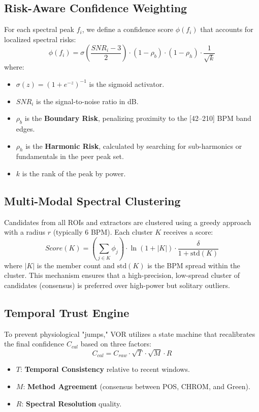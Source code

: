 \documentclass[10pt,journal,compsoc]{IEEEtran}
\begin{document}
\subsection{Risk-Aware Confidence Weighting}
For each spectral peak $f_i$, we define a confidence score $\phi(f_i)$ that accounts for localized spectral risks:
\begin{equation}
\phi(f_i) = \sigma\left(\frac{SNR_i - 3}{2}\right) \cdot (1 - \rho_b) \cdot (1 - \rho_h) \cdot \frac{1}{\sqrt{k}}
\end{equation}
where:
\begin{itemize}
    \item $\sigma(z) = (1+e^{-z})^{-1}$ is the sigmoid activator.
    \item $SNR_i$ is the signal-to-noise ratio in dB.
    \item $\rho_b$ is the \textbf{Boundary Risk}, penalizing proximity to the [42--210] BPM band edges.
    \item $\rho_h$ is the \textbf{Harmonic Risk}, calculated by searching for sub-harmonics or fundamentals in the peer peak set.
    \item $k$ is the rank of the peak by power.
\end{itemize}

\subsection{Multi-Modal Spectral Clustering}
Candidates from all ROIs and extractors are clustered using a greedy approach with a radius $r$ (typically 6 BPM). Each cluster $K$ receives a score:
\begin{equation}
Score(K) = \left( \sum_{j \in K} \phi_j \right) \cdot \ln(1 + |K|) \cdot \frac{\delta}{1 + \text{std}(K)}
\end{equation}
where $|K|$ is the member count and $\text{std}(K)$ is the BPM spread within the cluster. This mechanism ensures that a high-precision, low-spread cluster of candidates (consensus) is preferred over high-power but solitary outliers.

\subsection{Temporal Trust Engine}
To prevent physiological "jumps," VOR utilizes a state machine that recalibrates the final confidence $C_{cal}$ based on three factors:
\begin{equation}
C_{cal} = C_{raw} \cdot \sqrt{T} \cdot \sqrt{M} \cdot R
\end{equation}
\begin{itemize}
    \item $T$: \textbf{Temporal Consistency} relative to recent windows.
    \item $M$: \textbf{Method Agreement} (consensus between POS, CHROM, and Green).
    \item $R$: \textbf{Spectral Resolution} quality.
\end{itemize}
\end{document}
